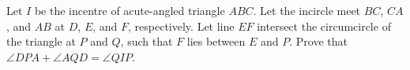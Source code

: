 Let $I$ be the incentre of acute-angled triangle $ABC$. Let the incircle meet $BC$, $CA$, and $AB$ at $D$, $E$, and $F$, respectively. Let line $EF$ intersect the circumcircle of the triangle at $P$ and $Q$, such that $F$ lies between $E$ and $P$. Prove that $\angle{DPA}+\angle{AQD}=\angle{QIP}$.
